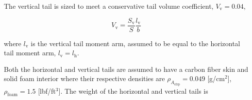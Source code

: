 \documentclass[]{aiaa-tc}%
\begin{document}
% 
% 
% 
% 
% 
% 

The vertical tail is sized to meet a conservative tail volume coefficient, $V_{\text{v}}= 0.04$,\cite{aircraftrules}

\begin{equation}
    \label{e:vtv}
    V_{\text{v}} = \frac{S_{\text{v}}}{S} \frac{l_{\text{v}}}{b}
\end{equation}

where $l_{\text{v}}$ is the vertical tail moment arm, assumed to be equal to the horizontal tail moment arm, $l_{\text{v}} = l_{\text{h}}$.

Both the horizontal and vertical tails are assumed to have a carbon fiber skin and solid foam interior where their respective densities are $\rho_{A_{\text{cfrp}}} = 0.049$ [g/cm$^2$], $\rho_{\text{foam}} = 1.5$ [lbf/ft$^3$]. 
The weight of the horizontal and vertical tails is
\end{document}
